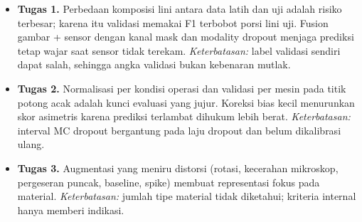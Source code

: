 \begin{itemize}
  \item \textbf{Tugas 1.} Perbedaan komposisi lini antara data latih dan uji adalah risiko terbesar; karena itu validasi memakai F1 terbobot porsi lini uji.
        Fusion gambar + sensor dengan kanal mask dan modality dropout menjaga prediksi tetap wajar saat sensor tidak terekam.
        \textit{Keterbatasan:} label validasi sendiri dapat salah, sehingga angka validasi bukan kebenaran mutlak.
  \item \textbf{Tugas 2.} Normalisasi per kondisi operasi dan validasi per mesin pada titik potong acak adalah kunci evaluasi yang jujur. Koreksi bias kecil menurunkan skor
        asimetris karena prediksi terlambat dihukum lebih berat. \textit{Keterbatasan:} interval MC dropout bergantung pada laju dropout dan belum dikalibrasi ulang.
  \item \textbf{Tugas 3.} Augmentasi yang meniru distorsi (rotasi, kecerahan mikroskop, pergeseran puncak, baseline, spike) membuat representasi fokus pada material.
        \textit{Keterbatasan:} jumlah tipe material tidak diketahui; kriteria internal hanya memberi indikasi.
\end{itemize}
